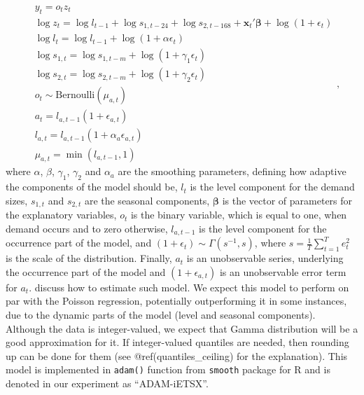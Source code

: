 \documentclass[]{elsarticle} %
\begin{document}
\begin{equation}
    \begin{aligned}
      & y_t = o_t z_t \\
        & \log z_t = \log l_{t-1} + \log s_{1,t-24} + \log s_{2,t-168} + \mathbf{x}_t' \boldsymbol{\beta} + \log \left(1 + \epsilon_{t} \right) \\
        & \log l_{t} = \log l_{t-1} + \log( 1  + \alpha \epsilon_{t}) \\ 
        & \log s_{1,t} = \log s_{1,t-m} + \log( 1  + \gamma_1 \epsilon_{t}) \\
        & \log s_{2,t} = \log s_{2,t-m} + \log( 1  + \gamma_2 \epsilon_{t}) \\
        & o_t \sim \text{Bernoulli} \left(\mu_{a,t} \right) \\
        & a_t = l_{a,t-1} \left(1 + \epsilon_{a,t} \right) \\
        & l_{a,t} = l_{a,t-1}( 1  + \alpha_{a} \epsilon_{a,t}) \\
        & \mu_{a,t} = \min(l_{a,t-1}, 1)
    \end{aligned} ,
    \label{eq:ADAMModel}
\end{equation}
where \(\alpha\), \(\beta\), \(\gamma_1\), \(\gamma_2\) and \(\alpha_a\) are the smoothing parameters, defining how adaptive the components of the model should be, \(l_t\) is the level component for the demand sizes, \(s_{1,t}\) and \(s_{2,t}\) are the seasonal components, \(\boldsymbol{\beta}\) is the vector of parameters for the explanatory variables, \(o_t\) is the binary variable, which is equal to one, when demand occurs and to zero otherwise, \(l_{a,t-1}\) is the level component for the occurrence part of the model, and \(\left(1+\epsilon_t \right) \sim \Gamma(s^{-1}, s)\), where \(s=\frac{1}{T} \sum_{t=1}^{T} e_{t}^2\) is the scale of the distribution. Finally, \(a_t\) is an unobservable series, underlying the occurrence part of the model and \((1 + \epsilon_{a,t})\) is an unobservable error term for \(a_t\). \citet{Svetunkov2019a} discuss how to estimate such model. We expect this model to perform on par with the Poisson regression, potentially outperforming it in some instances, due to the dynamic parts of the model (level and seasonal components). Although the data is integer-valued, we expect that Gamma distribution will be a good approximation for it. If integer-valued quantiles are needed, then rounding up can be done for them (see @ref(quantiles\_ceiling) for the explanation). This model is implemented in \texttt{adam()} function from \texttt{smooth} package \citep{Svetunkov2021Smooth} for R and is denoted in our experiment as ``ADAM-iETSX''.
\end{document}
